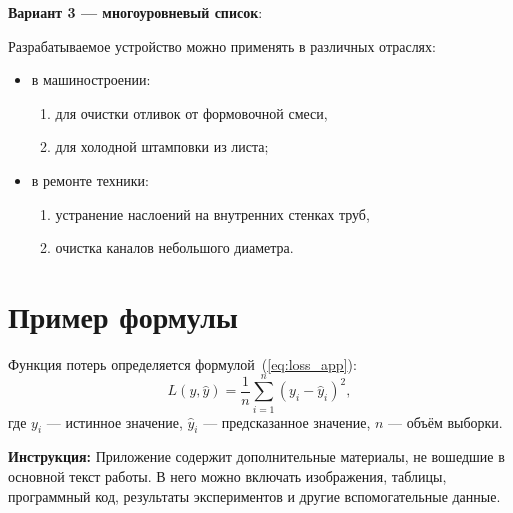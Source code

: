 \textbf{Вариант 3 --- многоуровневый список}:

Разрабатываемое устройство можно применять в различных отраслях:
\begin{itemize}
  \item в машиностроении:
  \begin{enumerate}
    \item для очистки отливок от формовочной смеси,
    \item для холодной штамповки из листа;
  \end{enumerate}
  \item в ремонте техники:
  \begin{enumerate}
    \item устранение наслоений на внутренних стенках труб,
    \item очистка каналов небольшого диаметра.
  \end{enumerate}
\end{itemize}

\section*{Пример формулы}

Функция потерь определяется формулой~(\ref{eq:loss_app}):
\begin{equation}
L(y, \hat{y}) = \frac{1}{n} \sum_{i=1}^{n} (y_i - \hat{y}_i)^2,
\label{eq:loss_app}
\end{equation}
где $y_i$ --- истинное значение, $\hat{y}_i$ --- предсказанное значение, $n$ --- объём выборки.

\bigskip
\textbf{Инструкция:} Приложение содержит дополнительные материалы, не вошедшие в основной текст работы. В него можно включать изображения, таблицы, программный код, результаты экспериментов и другие вспомогательные данные.
